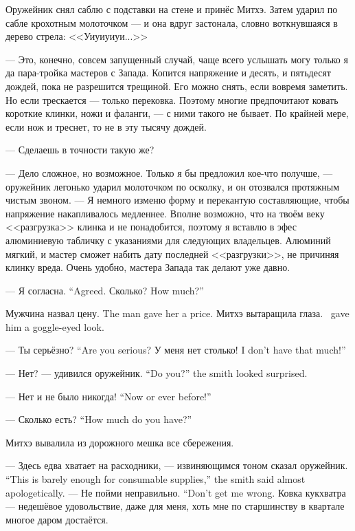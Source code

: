 Оружейник снял саблю с подставки на стене и принёс Митхэ.
Затем ударил по сабле крохотным молоточком --- и она вдруг застонала, словно воткнувшаяся в дерево стрела: <<Уиуиуиуи...>>

--- Это, конечно, совсем запущенный случай, чаще всего услышать могу только я да пара-тройка мастеров с Запада.
Копится напряжение и десять, и пятьдесят дождей, пока не разрешится трещиной.
Его можно снять, если вовремя заметить.
Но если трескается --- только перековка.
Поэтому многие предпочитают ковать короткие клинки, ножи и фаланги, --- с ними такого не бывает.
По крайней мере, если нож и треснет, то не в эту тысячу дождей.

--- Сделаешь в точности такую же?

--- Дело сложное, но возможное.
Только я бы предложил кое-что получше, --- оружейник легонько ударил молоточком по осколку, и он отозвался протяжным чистым звоном.
--- Я немного изменю форму и перекантую составляющие, чтобы напряжение накапливалось медленнее.
Вполне возможно, что на твоём веку <<разгрузка>> клинка и не понадобится, поэтому я вставлю в эфес алюминиевую табличку с указаниями для следующих владельцев.
Алюминий мягкий, и мастер сможет набить дату последней <<разгрузки>>, не причиняя клинку вреда.
Очень удобно, мастера Запада так делают уже давно.

{--- Я согласна.}
{``Agreed.}
{Сколько?}
{How much?''}

{Мужчина назвал цену.}
{The man gave her a price.}
{Митхэ вытаращила глаза.}
{\Mitchoe\ gave him a goggle-eyed look.}

{--- Ты серьёзно?}
{``Are you serious?}
{У меня нет столько!}
{I don't have that much!''}

{--- Нет? --- удивился оружейник.}
{``Do you?'' the smith looked surprised.}

{--- Нет и не было никогда!}
{``Now or ever before!''}

{--- Сколько есть?}
{``How much do you have?''}

Митхэ вывалила из дорожного мешка все сбережения.

{--- Здесь едва хватает на расходники, --- извиняющимся тоном сказал оружейник.}
{``This is barely enough for consumable supplies,'' the smith said almost apologetically.}
{--- Не пойми неправильно.}
{``Don't get me wrong.}
Ковка кукхватра --- недешёвое удовольствие, даже для меня, хоть мне по старшинству в квартале многое даром достаётся.

